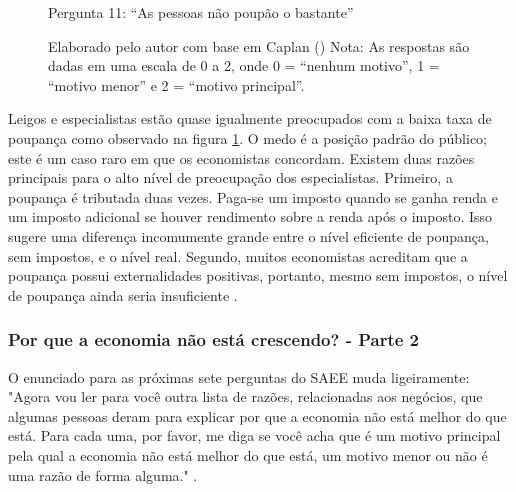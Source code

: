 \begin{figure}[H]
    \centering
    \caption*{Pergunta 11: “As pessoas não poupão o bastante”}
    \caption{Elaborado pelo autor com base em Caplan (\citeyear{The_Myth_of_the_Rational_Voter}) \newline
    Nota: As respostas são dadas em uma escala de 0 a 2, onde 0 = “nenhum motivo”, 1 = “motivo menor” e 2 = “motivo principal”.}
    \label{fig:pergunta_11}
\end{figure}

Leigos e especialistas estão quase igualmente preocupados com a baixa taxa de poupança como observado na figura \ref{fig:pergunta_11}. O medo é a posição padrão do público; este é um caso raro em que os economistas concordam. Existem duas razões principais para o alto nível de preocupação dos especialistas. Primeiro, a poupança é tributada duas vezes. Paga-se um imposto quando se ganha renda e um imposto adicional se houver rendimento sobre a renda após o imposto. Isso sugere uma diferença incomumente grande entre o nível eficiente de poupança, sem impostos, e o nível real. Segundo, muitos economistas acreditam que a poupança possui externalidades positivas, portanto, mesmo sem impostos, o nível de poupança ainda seria insuficiente \cite{The_Myth_of_the_Rational_Voter}.

\subsubsection{Por que a economia não está crescendo? - Parte 2}

O enunciado para as próximas sete perguntas do SAEE muda ligeiramente: "Agora vou ler para você outra lista de razões, relacionadas aos negócios, que algumas pessoas deram para explicar por que a economia não está melhor do que está. Para cada uma, por favor, me diga se você acha que é um motivo principal pela qual a economia não está melhor do que está, um motivo menor ou não é uma razão de forma alguma." \cite{saee1996}.

